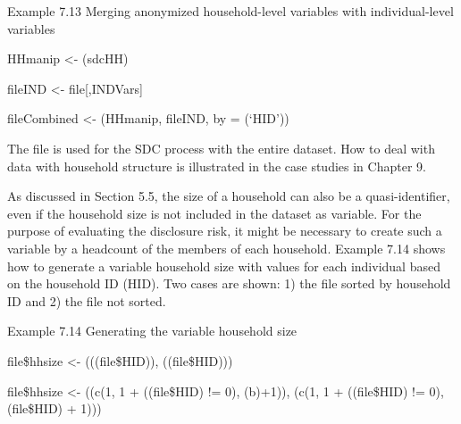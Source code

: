 \documentclass[letterpaper,10pt,english]{sphinxmanual}
\begin{document}
Example 7.13 Merging anonymized household-level variables with
individual-level variables

\begin{DUlineblock}{0em}
\item[] 
\item[] HHmanip \textless{}- (sdcHH)
\item[] 
\item[] fileIND \textless{}- file{[},INDVars{]}
\end{DUlineblock}

\begin{DUlineblock}{0em}
\item[] 
\item[] fileCombined \textless{}- (HHmanip, fileIND, by = (‘HID’))
\end{DUlineblock}

The file  is used for the SDC process with the entire
dataset. How to deal with data with household structure is illustrated
in the case studies in Chapter 9.

As discussed in Section 5.5, the size of a household can also be a
quasi-identifier, even if the household size is not included in the
dataset as variable. For the purpose of evaluating the disclosure risk,
it might be necessary to create such a variable by a headcount of the
members of each household. Example 7.14 shows how to generate a variable
household size with values for each individual based on the household ID
(HID). Two cases are shown: 1) the file sorted by household ID and 2)
the file not sorted.

Example 7.14 Generating the variable household size


file\$hhsize \textless{}- (((file\$HID)),
((file\$HID)))


file\$hhsize \textless{}- ((c(1, 1 +
((file\$HID) != 0), (b)+1)),
(c(1, 1 + ((file\$HID) != 0),
(file\$HID) + 1)))
\end{document}
